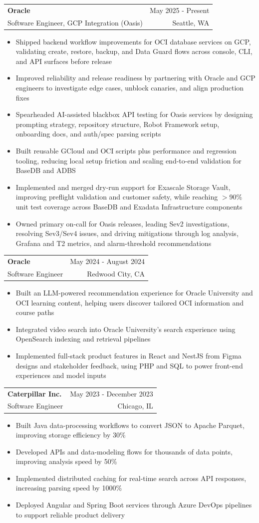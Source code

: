 \documentclass[letterpaper,11pt]{article}
\makeatletter
\newcommand{\resumeItem}[1]{
  \item\small{
    {#1 \vspace{-2pt}}
  }
}
\newcommand{\resumeSubheading}[4]{
  \vspace{-2pt}\item
    \begin{tabular*}{0.97\textwidth}[t]{l@{\extracolsep{\fill}}r}
      \textbf{#1} & #2 \\
      {\small#3} & {\small #4} \\
    \end{tabular*}\vspace{-7pt}
}
\newcommand{\resumeItemListStart}{\begin{itemize}}
\newcommand{\resumeItemListEnd}{\end{itemize}\vspace{-5pt}}
\makeatother
\begin{document}
    \resumeSubheading
  {Oracle}{May 2025 - Present}
  {Software Engineer, GCP Integration (Oasis)}{Seattle, WA}
  \resumeItemListStart
    \resumeItem{Shipped backend workflow improvements for OCI database services on GCP, validating create, restore, backup, and Data Guard flows across console, CLI, and API surfaces before release}
    \resumeItem{Improved reliability and release readiness by partnering with Oracle and GCP engineers to investigate edge cases, unblock canaries, and align production fixes}
    \resumeItem{Spearheaded AI-assisted blackbox API testing for Oasis services by designing prompting strategy, repository structure, Robot Framework setup, onboarding docs, and auth/spec parsing scripts}
    \resumeItem{Built reusable GCloud and OCI scripts plus performance and regression tooling, reducing local setup friction and scaling end-to-end validation for BaseDB and ADBS}
    \resumeItem{Implemented and merged dry-run support for Exascale Storage Vault, improving preflight validation and customer safety, while reaching $>$90\% unit test coverage across BaseDB and Exadata Infrastructure components}
    \resumeItem{Owned primary on-call for Oasis releases, leading Sev2 investigations, resolving Sev3/Sev4 issues, and driving mitigations through log analysis, Grafana and T2 metrics, and alarm-threshold recommendations}
  \resumeItemListEnd

    \resumeSubheading
      {Oracle}{May 2024 - August 2024}
      {Software Engineer}{Redwood City, CA}
      \resumeItemListStart
        \resumeItem{Built an LLM-powered recommendation experience for Oracle University and OCI learning content, helping users discover tailored OCI information and course paths}
        \resumeItem{Integrated video search into Oracle University's search experience using OpenSearch indexing and retrieval pipelines}
        \resumeItem{Implemented full-stack product features in React and NestJS from Figma designs and stakeholder feedback, using PHP and SQL to power front-end experiences and model inputs}
      \resumeItemListEnd

    \resumeSubheading
      {Caterpillar Inc.}{May 2023 - December 2023}
      {Software Engineer}{Chicago, IL}
      \resumeItemListStart
        \resumeItem{Built Java data-processing workflows to convert JSON to Apache Parquet, improving storage efficiency by 30\%}
        \resumeItem{Developed APIs and data-modeling flows for thousands of data points, improving analysis speed by 50\%}
        \resumeItem{Implemented distributed caching for real-time search across API responses, increasing parsing speed by 1000\%}
        \resumeItem{Deployed Angular and Spring Boot services through Azure DevOps pipelines to support reliable product delivery}
      \resumeItemListEnd
\end{document}
